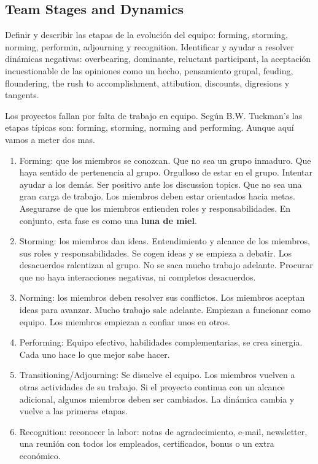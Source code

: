 \documentclass[]{article}
\begin{document}
\subsection{Team Stages and Dynamics}

Definir y describir las etapas de la evolución del equipo: forming, storming, norming, performin, adjourning y recognition. Identificar y ayudar a resolver dinámicas negativas: overbearing, dominante, reluctant participant, la aceptación incuestionable de las opiniones como un hecho, pensamiento grupal, feuding, floundering, the rush to accomplishment, attibution, discounts, digresions y tangents.

Los proyectos fallan por falta de trabajo en equipo. Según B.W. Tuckman's las etapas típicas son: forming, storming, norming and performing. Aunque aquí vamos a meter dos mas.

\begin{enumerate}
	\item Forming: que los miembros se conozcan. Que no sea un grupo inmaduro. Que haya sentido de pertenencia al grupo. Orgulloso de estar en el grupo. Intentar ayudar a los demás. Ser positivo ante los discussion topics. Que no sea una gran carga de trabajo. Los miembros deben estar orientados hacia metas. Asegurarse de que los miembros entienden roles y responsabilidades. En conjunto, esta fase es como una \textbf{luna de miel}.
	\item Storming: los miembros dan ideas. Entendimiento y alcance de los miembros, sus roles y responsabilidades. Se cogen ideas y se empieza a debatir. Los desacuerdos ralentizan al grupo. No se saca mucho trabajo adelante. Procurar que no haya interacciones negativas, ni completos desacuerdos.
	\item Norming: los miembros deben resolver sus conflictos. Los miembros aceptan ideas para avanzar. Mucho trabajo sale adelante. Empiezan a funcionar como equipo. Los miembros empiezan a confiar unos en otros. 
	\item Performing: Equipo efectivo, habilidades complementarias, se crea sinergia. Cada uno hace lo que mejor sabe hacer.
	\item Transitioning/Adjourning: Se disuelve el equipo. Los miembros vuelven a otras actividades de su trabajo. Si el proyecto continua con un alcance adicional, algunos miembros deben ser cambiados. La dinámica cambia y vuelve a las primeras etapas. 
	\item Recognition: reconocer la labor: notas de agradecimiento, e-mail, newsletter, una reunión con todos los empleados, certificados, bonus o un extra económico.
\end{enumerate}
\end{document}
